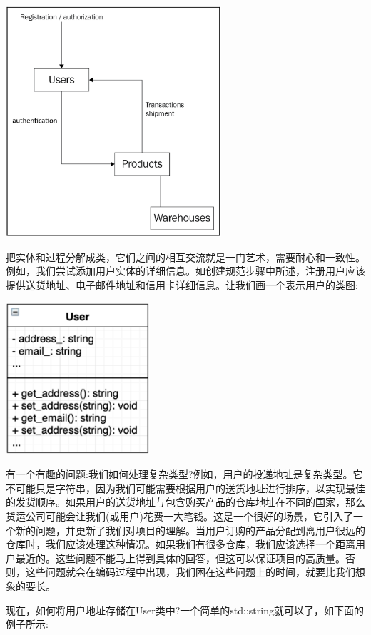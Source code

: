 \begin{center}
	\includegraphics[width=0.6\textwidth]{content/Section-2/Chapter-10/1}
\end{center}

把实体和过程分解成类，它们之间的相互交流就是一门艺术，需要耐心和一致性。例如，我们尝试添加用户实体的详细信息。如创建规范步骤中所述，注册用户应该提供送货地址、电子邮件地址和信用卡详细信息。让我们画一个表示用户的类图: \par

\begin{center}
	\includegraphics[width=0.4\textwidth]{content/Section-2/Chapter-10/2}
\end{center}

有一个有趣的问题:我们如何处理复杂类型?例如，用户的投递地址是复杂类型。它不可能只是字符串，因为我们可能需要根据用户的送货地址进行排序，以实现最佳的发货顺序。如果用户的送货地址与包含购买产品的仓库地址在不同的国家，那么货运公司可能会让我们(或用户)花费一大笔钱。这是一个很好的场景，它引入了一个新的问题，并更新了我们对项目的理解。当用户订购的产品分配到离用户很远的仓库时，我们应该处理这种情况。如果我们有很多仓库，我们应该选择一个距离用户最近的。这些问题不能马上得到具体的回答，但这可以保证项目的高质量。否则，这些问题就会在编码过程中出现，我们困在这些问题上的时间，就要比我们想象的要长。 \par
现在，如何将用户地址存储在User类中?一个简单的std::string就可以了，如下面的例子所示: \par

